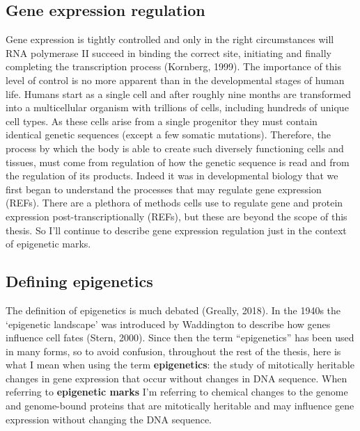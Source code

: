 \documentclass[11pt,twoside]{bristolthesis}
\begin{document}
\hypertarget{gene-expression-regulation}{%
\subsection{Gene expression regulation}\label{gene-expression-regulation}}

Gene expression is tightly controlled and only in the right circumstances will RNA polymerase II succeed in binding the correct site, initiating and finally completing the transcription process (Kornberg, 1999). The importance of this level of control is no more apparent than in the developmental stages of human life. Humans start as a single cell and after roughly nine months are transformed into a multicellular organism with trillions of cells, including hundreds of unique cell types. As these cells arise from a single progenitor they must contain identical genetic sequences (except a few somatic mutations). Therefore, the process by which the body is able to create such diversely functioning cells and tissues, must come from regulation of how the genetic sequence is read and from the regulation of its products. Indeed it was in developmental biology that we first began to understand the processes that may regulate gene expression (REFs). There are a plethora of methods cells use to regulate gene and protein expression post-transcriptionally (REFs), but these are beyond the scope of this thesis. So I'll continue to describe gene expression regulation just in the context of epigenetic marks.

\hypertarget{defining-epigenetics}{%
\subsection{Defining epigenetics}\label{defining-epigenetics}}

The definition of epigenetics is much debated (Greally, 2018). In the 1940s the `epigenetic landscape' was introduced by Waddington to describe how genes influence cell fates (Stern, 2000). Since then the term ``epigenetics'' has been used in many forms, so to avoid confusion, throughout the rest of the thesis, here is what I mean when using the term \textbf{epigenetics}: the study of mitotically heritable changes in gene expression that occur without changes in DNA sequence. When referring to \textbf{epigenetic marks} I'm referring to chemical changes to the genome and genome-bound proteins that are mitotically heritable and may influence gene expression without changing the DNA sequence.
\end{document}
